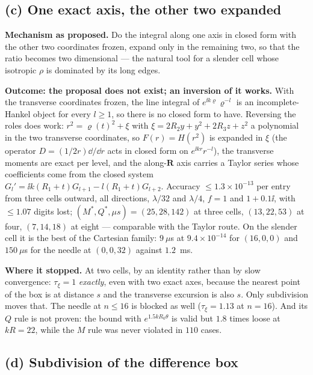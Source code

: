 \subsection{(c) One exact axis, the other two expanded}
\label{sec:reg:c}

\textbf{Mechanism as proposed.} Do the integral along one axis in closed form with the
other two coordinates frozen, expand only in the remaining two, so that the ratio becomes
two dimensional --- the natural tool for a slender cell whose isotropic $\rho$ is
dominated by its long edges.

\textbf{Outcome: the proposal does not exist; an inversion of it works.} With the
transverse coordinates frozen, the line integral of $e^{\ii k\varrho}\varrho^{-l}$ is an
incomplete-Hankel object for every $l \ge 1$, so there is no closed form to have. Reversing
the roles does work: $r^2 = \varrho(t)^2 + \xi$ with $\xi = 2R_2y+y^2+2R_3z+z^2$ a
polynomial in the two transverse coordinates, so $F(r) = H(r^2)$ is expanded in $\xi$
(the operator $D = (1/2r)\dd/\dd r$ acts in closed form on $e^{\ii kr}r^{-l}$), the
transverse moments are exact per level, and the along-$\mathbf{R}$ axis carries a Taylor
series whose coefficients come from the closed system
$G_l' = \ii k(R_1+t)G_{l+1} - l(R_1+t)G_{l+2}$. Accuracy $\le 1.3\times10^{-13}$ per
entry from three cells outward, all directions, $\lambda/32$ and $\lambda/4$, $f = 1$ and
$1+0.1\ii$, with $\le 1.07$ digits lost; $(M^*,Q^*,\mu s) = (25,28,142)$ at three cells,
$(13,22,53)$ at four, $(7,14,18)$ at eight --- comparable with the Taylor route. On the
slender cell it is the best of the Cartesian family: $9~\mu$s at $9.4\times10^{-14}$ for
$(16,0,0)$ and $150~\mu$s for the needle at $(0,0,32)$ against $1.2$~ms.

\textbf{Where it stopped.} At two cells, by an identity rather than by slow convergence:
$\tau_\xi = 1$ \emph{exactly}, even with two exact axes, because the nearest point of the
box is at distance $s$ and the transverse excursion is also $s$. Only subdivision moves
that. The needle at $n \le 16$ is blocked as well ($\tau_\xi = 1.13$ at $n = 16$). And its
$Q$ rule is not proven: the bound with $e^{1.5k R_0\theta}$ is valid but $1.8$ times loose
at $kR = 22$, while the $M$ rule was never violated in $110$ cases.

\subsection{(d) Subdivision of the difference box}
\label{sec:reg:d}

